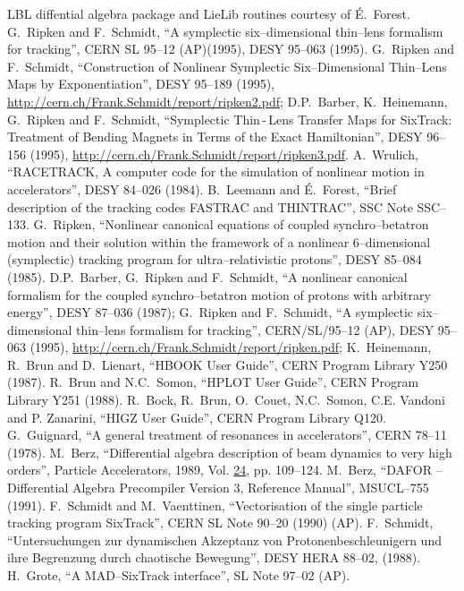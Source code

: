 \begin{thebibliography}{99}
     LBL diffential algebra package and LieLib routines
      courtesy of \'{E}.~Forest. 
     G.~Ripken and F.~Schmidt, ``A symplectic
      six--dimensional thin--lens formalism for tracking'', CERN SL 95--12
      (AP)(1995), DESY 95--063 (1995).  
      G.~Ripken and F.~Schmidt, ``Construction of Nonlinear Symplectic
      Six--Dimensional Thin--Lens Maps by Exponentiation'', DESY 95--189
      (1995),
      \url{http://cern.ch/Frank.Schmidt/report/ripken2.pdf}; D.P.~Barber,
      K.~Heinemann, G.~Ripken and F.~Schmidt, ``Symplectic Thin\,-\,Lens
      Transfer Maps for SixTrack: Treatment of Bending Magnets in Terms of
      the Exact Hamiltonian'', DESY 96--156 (1995),
      \url{http://cern.ch/Frank.Schmidt/report/ripken3.pdf}.  
     A.~Wrulich, ``RACETRACK, A computer code for the
      simulation of nonlinear motion in accelerators'', DESY 84--026
      (1984).  
     B.~Leemann and \'{E}.~Forest, ``Brief
      description of the tracking codes FASTRAC and THINTRAC'', SSC Note
      SSC--133.  
     G.~Ripken, ``Nonlinear canonical
      equations of coupled synchro--betatron motion and their solution
      within the framework of a nonlinear 6--dimensional (symplectic)
      tracking program for ultra--relativistic protons'', DESY 85--084
      (1985).  
     D.P.~Barber, G.~Ripken and F.~Schmidt,
      ``A nonlinear canonical formalism for the coupled
      synchro--betatron motion of protons with arbitrary energy'', DESY
      87--036 (1987); G.~Ripken and F.~Schmidt, ``A symplectic
      six--dimensional thin--lens formalism for tracking'', CERN/SL/95--12
      (AP), DESY 95--063 (1995),
      \url{http://cern.ch/Frank.Schmidt/report/ripken.pdf}; K.~Heinemann,
      R.~Brun and D.~Lienart, ``HBOOK User Guide'', CERN Program Library
      Y250 (1987).  
     R.~Brun and N.C.~Somon, ``HPLOT User
      Guide'', CERN Program Library Y251 (1988).  
     R.~Bock,
      R.~Brun, O.~Couet, N.C.~Somon, C.E. Vandoni and P. Zanarini, ``HIGZ
      User Guide'', CERN Program Library Q120.  
      G.~Guignard, ``A general treatment of resonances in accelerators'',
      CERN 78--11 (1978).  
     M.~Berz, ``Differential
      algebra description of beam dynamics to very high orders'', Particle
      Accelerators, 1989, Vol. \underline{24}, pp. 109--124.
     M.~Berz, ``DAFOR -- Differential Algebra Precompiler
      Version 3, Reference Manual'', MSUCL--755 (1991).
     F.~Schmidt and M.~Vaenttinen, ``Vectorisation of the
      single particle tracking program SixTrack'', CERN SL Note 90--20
      (1990) (AP).  
     F.~Schmidt, ``Untersuchungen zur dynamischen
      Akzeptanz von Protonenbeschleunigern und ihre Begrenzung durch
      chaotische Bewegung'', DESY HERA 88--02, (1988).  
     H.~Grote, ``A MAD--SixTrack interface'', SL Note
      97--02 (AP).  
    

\end{thebibliography}
